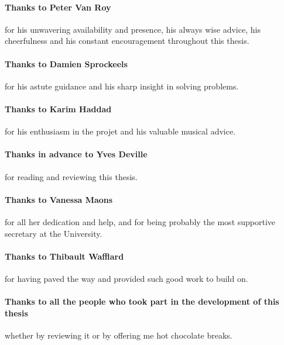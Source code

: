 \documentclass[11pt,table,xcdraw]{report}
\begin{document}
\paragraph{Thanks to Peter Van Roy} for his unwavering availability and presence, his always wise advice, his cheerfulness and his constant encouragement throughout this thesis.
\paragraph{Thanks to Damien Sprockeels} for his astute guidance and his sharp insight in solving problems.
\paragraph{Thanks to Karim Haddad} for his enthusiasm in the projet and his valuable musical advice.
\paragraph{Thanks in advance to Yves Deville} for reading and reviewing this thesis.
\paragraph{Thanks to Vanessa Maons} for all her dedication and help, and for being probably the most supportive secretary at the University.
\paragraph{Thanks to Thibault Wafflard} for having paved the way and provided such good work to build on.
\paragraph{Thanks to all the people who took part in the development of this thesis} whether by reviewing it or by offering me hot chocolate breaks.
\restoregeometry 

\tableofcontents








%
\printbibliography

%
\appendix






\end{document}
